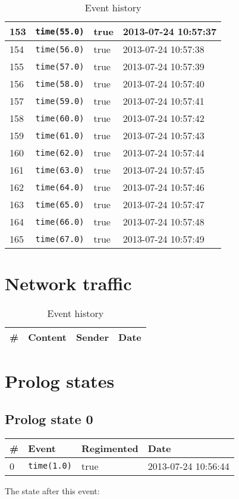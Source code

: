 \documentclass[11pt]{article}\usepackage[utf8]{inputenc}\usepackage{geometry}
\begin{document}
\begin{table}[ht]
\begin{tabular}{l l l l}
153&\texttt{time(55.0)}&true&2013-07-24 10:57:37\\ [1ex] \hline
154&\texttt{time(56.0)}&true&2013-07-24 10:57:38\\ [1ex] \hline
155&\texttt{time(57.0)}&true&2013-07-24 10:57:39\\ [1ex] \hline
156&\texttt{time(58.0)}&true&2013-07-24 10:57:40\\ [1ex] \hline
157&\texttt{time(59.0)}&true&2013-07-24 10:57:41\\ [1ex] \hline
158&\texttt{time(60.0)}&true&2013-07-24 10:57:42\\ [1ex] \hline
159&\texttt{time(61.0)}&true&2013-07-24 10:57:43\\ [1ex] \hline
160&\texttt{time(62.0)}&true&2013-07-24 10:57:44\\ [1ex] \hline
161&\texttt{time(63.0)}&true&2013-07-24 10:57:45\\ [1ex] \hline
162&\texttt{time(64.0)}&true&2013-07-24 10:57:46\\ [1ex] \hline
163&\texttt{time(65.0)}&true&2013-07-24 10:57:47\\ [1ex] \hline
164&\texttt{time(66.0)}&true&2013-07-24 10:57:48\\ [1ex] \hline
165&\texttt{time(67.0)}&true&2013-07-24 10:57:49\\ [1ex] \hline
\end{tabular}
\caption{Event history}
\label{events}  
\end{table}

\section{Network traffic}

\begin{table}[ht]
\centering 
\begin{tabular}{l l l l} 
\textbf{\#} & \textbf{Content} & \textbf{Sender} & \textbf{Date} \\ [0.5ex] 
\hline
\end{tabular}
\caption{Event history}
\label{events}  
\end{table}

\section{Prolog states}
\clearpage 
\subsection{Prolog state 0}
\begin{table}[ht]
\centering 
\begin{tabular}{l l l l} 
\textbf{\#} & \textbf{Event} & \textbf{Regimented} & \textbf{Date} \\ [0.5ex] 
\hline
0&\texttt{time(1.0)}&true&2013-07-24 10:56:44\\ [1ex] \hline\end{tabular}
\end{table}
The state after this event:
\end{document}
